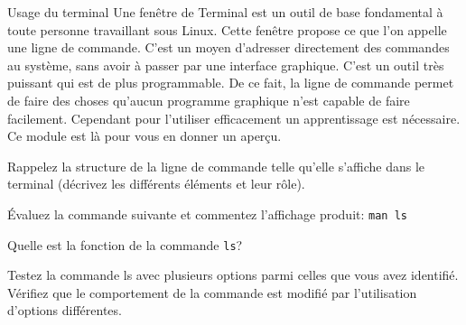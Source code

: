 \begin{exercice}
  \begin{exercicelet}{Usage du terminal}
    Une fenêtre de Terminal est un outil de base fondamental à toute
    personne travaillant sous Linux. Cette fenêtre propose ce que l'on
    appelle une ligne de commande. C'est un moyen d'adresser directement
    des commandes au système, sans avoir à passer par une interface
    graphique. C'est un outil très puissant qui est de plus
    programmable.  De ce fait, la ligne de commande permet de faire des
    choses qu'aucun programme graphique n'est capable de faire
    facilement. Cependant pour l'utiliser efficacement un apprentissage
    est nécessaire. Ce module est là pour vous en donner un aperçu.
    \begin{questions}
    \item Rappelez la structure de la ligne de commande telle qu'elle
      s'affiche dans le terminal (décrivez les différents éléments et
      leur rôle).
    \item Évaluez la commande suivante et commentez l'affichage produit:
      \texttt{man ls}
    \item Quelle est la fonction de la commande \texttt{ls}?
    \item Testez la commande ls avec plusieurs options parmi celles que
      vous avez identifié. Vérifiez que le comportement de la commande
      est modifié par l'utilisation d'options différentes.
    \end{questions}
  \end{exercicelet}
\end{exercice}

